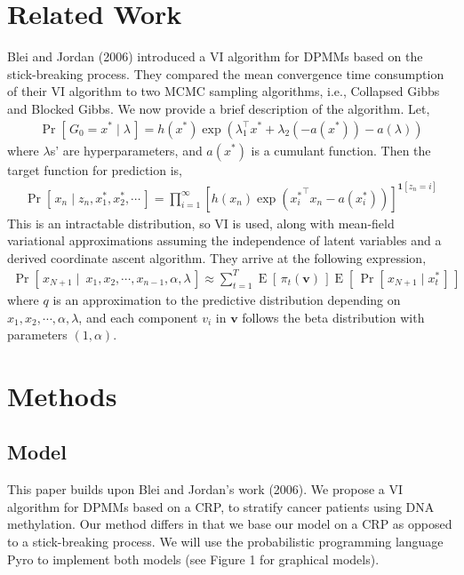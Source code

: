 \documentclass{article}
\newcommand{\prob}[1]{\operatorname{Pr}\left[\,#1\,\right]}
\newcommand{\expect}[1]{\operatorname{E}\left[\,#1\,\right]}
\def\cond{\; | \;}
\begin{document}
\section{Related Work}
Blei and Jordan (2006) introduced a VI algorithm for DPMMs based on the stick-breaking process. They compared the mean convergence time consumption of their VI algorithm to two MCMC sampling algorithms, i.e., Collapsed Gibbs and Blocked Gibbs. We now provide a brief description of the algorithm. Let,
\begin{align*}
\prob{G_0 = x^*\cond \lambda} = h(x^*)\exp(\lambda_1^\top x^* + \lambda_2(-a(x^*)) - a(\lambda))
\end{align*}
where $\lambda$s' are hyperparameters,  and $a(x^*)$ is a cumulant function.  Then the target function for prediction is,
\begin{align*}
\prob{x_n\cond z_n, x_1^*, x_2^*, \cdots} = \prod_{i=1}^\infty [h(x_n)\exp({x_i^*}^\top x_n - a(x_i^*))]^{\mathbf{1}[z_n = i]}
\end{align*}
This is an intractable distribution, so VI is used, along with mean-field variational approximations assuming the independence of latent variables and a derived coordinate ascent algorithm. They arrive at the following expression,
\begin{align*}
\prob{x_{N+1}\cond \ x_1, x_2, \cdots, x_{n-1}, \alpha, \lambda}\approx \sum_{t=1}^T \expect{\pi_t(\mathbf{v})}\expect{\prob{x_{N+1}\cond x_t^*}}
\end{align*}
where $q$ is an approximation to the predictive distribution depending on $x_1, x_2, \cdots, \alpha, \lambda$,  and each component $v_i$ in $\mathbf{v}$ follows the beta distribution with parameters $(1, \alpha)$.

\section{Methods}
\subsection{Model}
This paper builds upon Blei and Jordan's work (2006). We propose a VI algorithm for DPMMs based on a CRP, to stratify cancer patients using DNA methylation. Our method differs in that we base our model on a CRP as opposed to a stick-breaking process. We will use the probabilistic programming language Pyro to implement both models (see Figure 1 for graphical models).
\end{document}
